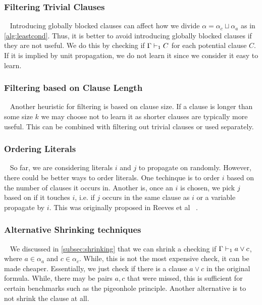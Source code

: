 
\subsubsection{Filtering Trivial Clauses}~\label{subsubsec:filteringtriv}
Introducing globally blocked clauses can affect how we divide $\alpha = \alpha_c
\sqcup \alpha_a$ as in \autoref{alg:leastcond}. Thus, it is better to avoid
introducing globally blocked clauses if they are not useful. We do this by
checking if $\Gamma \vdash_1 C$ for each potential clause $C$. If it is implied by
unit propagation, we do not learn it since we consider it easy to learn.

\subsubsection{Filtering based on Clause Length}~\label{subsubsec:filtering-length}
Another heuristic for filtering is based on clause size. If a clause is longer
than some size $k$ we may choose not to learn it as shorter clauses are
typically more useful. This can be combined with filtering out trivial clauses
or used separately.

\subsubsection{Ordering Literals}~\label{subsubsec:ordering-literals}
So far, we are considering literals $i$ and $j$ to propagate on randomly.
However, there could be better ways to order literals. One techinque is to order
$i$ based on the number of clauses it occurs in. Another is, once an $i$ is
chosen, we pick $j$ based on if it touches $i$, i.e. if $j$ occurs in the same
clause as $i$ or a variable propagate by $i$. This was originally proposed in
Reeves et al ~\cite{prelearn}.

\subsubsection{Alternative Shrinking techniques}~\label{subsubsec:shrink-techniques}
We discussed in \autoref{subsec:shrinking} that we can shrink a checking if $\Gamma
\vdash_1 a \lor c$, where $a \in \alpha_a$ and $c \in \alpha_c$. While, this is
not the most expensive check, it can be made cheaper. Essentially, we just check
if there is a clause $a \lor c$ in the original formula. While, there may be
pairs $a, c$ that were missed, this is sufficient for certain
benchmarks such as the pigeonhole principle. Another alternative is to not
shrink the clause at all.

